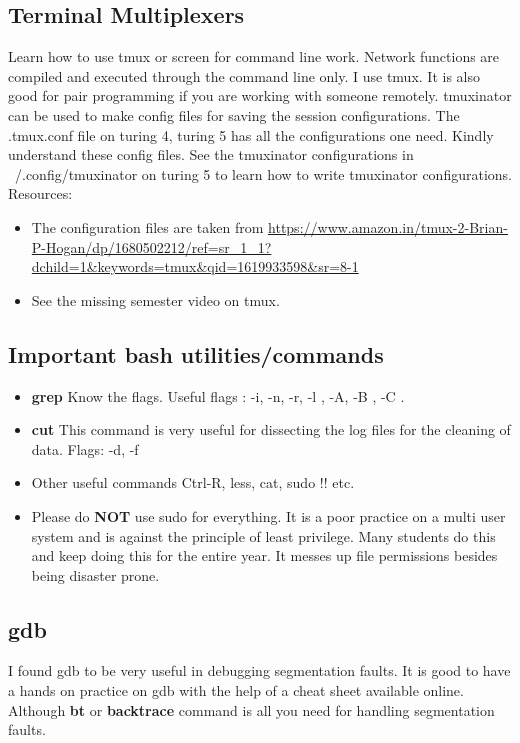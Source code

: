 \documentclass{article}
\begin{document}
\subsection{Terminal Multiplexers}
Learn how to use tmux or screen for command line work. Network functions are compiled and executed through the command line only.
I use tmux. It is also good for pair programming if you are working with someone remotely. tmuxinator can be used to make config files for saving the session configurations. The .tmux.conf file on turing 4, turing 5 has all the configurations one need. Kindly understand these config files. See the tmuxinator configurations in ~/.config/tmuxinator on turing 5 to learn how to write tmuxinator configurations.
Resources:
\begin{itemize}
    \item The configuration files are taken from \url{https://www.amazon.in/tmux-2-Brian-P-Hogan/dp/1680502212/ref=sr_1_1?dchild=1&keywords=tmux&qid=1619933598&sr=8-1}
    \item See the missing semester video on tmux.
\end{itemize}
\subsection{Important bash utilities/commands}
\begin{itemize}
    \item \textbf{grep} Know the flags. Useful flags : -i, -n, -r, -l , -A, -B , -C .
    \item \textbf{cut} This command is very useful for dissecting the log files for the cleaning of data. Flags: -d, -f
    \item{Other useful commands} Ctrl-R, less, cat, sudo !! etc.
    \item Please do \textbf{NOT} use sudo for everything. It is a poor practice on a multi user system and is against the principle of least privilege. Many students do this and keep doing this for the entire year. It messes up file permissions besides being disaster prone.
\end{itemize}
\subsection{gdb}
I found gdb to be very useful in debugging segmentation faults. It is good to have a hands on practice on gdb with the help of a cheat sheet available online. Although \textbf{bt} or \textbf{backtrace} command is all you need for handling segmentation faults.
\end{document}
